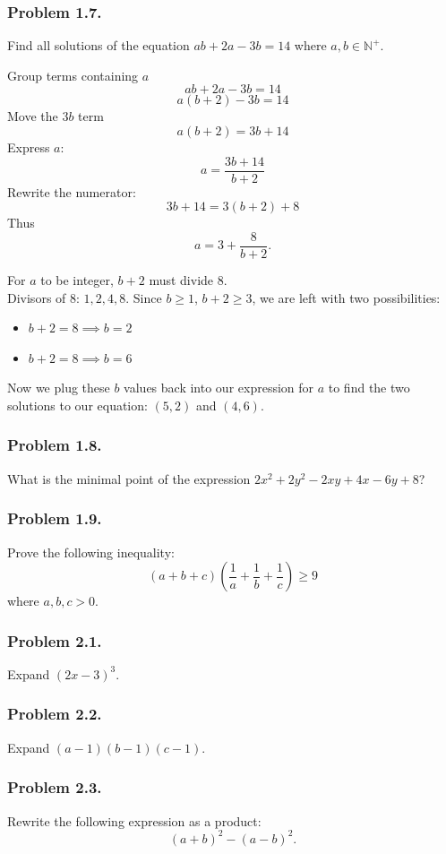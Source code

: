 \documentclass{article}
\begin{document}
\subsubsection{Problem 1.7.}
Find all solutions of the equation $ab + 2a - 3b = 14$ where $a, b \in \mathbb{N^+}$.

Group terms containing $a$
\[
    ab + 2a - 3b = 14
\]
\[
    a(b+2) - 3b = 14
\]
Move the $3b$ term
\[
    a(b+2) = 3b + 14
\]
Express $a$:
\[
    a = \frac{3b+14}{b+2} 
\]
Rewrite the numerator:
\[
    3b+14 = 3(b+2) + 8
\]
Thus
\[
    a = 3 + \frac{8}{b+2}.
\]

For $a$ to be integer, $b+2$ must divide 8.\\
Divisors of 8: $1, 2, 4, 8$. Since $b \ge 1$, $b+2 \ge 3$, we are left with two possibilities:
\begin{itemize}
    \item $b + 2 = 8 \implies b = 2$
    \item $b + 2 = 8 \implies b = 6$
\end{itemize}

Now we plug these $b$ values back into our expression for $a$ to find the two solutions to our equation: $(5,2)$ and $(4, 6)$.

\subsubsection{Problem 1.8.}
What is the minimal point of the expression $2x^2 + 2y^2 - 2xy + 4x -6y + 8$?

\subsubsection{Problem 1.9.}
Prove the following inequality:
\[
(a+b+c)(\frac{1}{a} + \frac{1}{b} + \frac{1}{c}) \ge 9
\]
where $a, b, c > 0$.

\subsubsection{Problem 2.1.}
Expand $(2x-3)^3$.

\subsubsection{Problem 2.2.}
Expand $(a-1)(b-1)(c-1)$.

\subsubsection{Problem 2.3.}
Rewrite the following expression as a product:
\begin{equation}
    (a+b)^2 - (a-b)^2.
\end{equation}
\end{document}
